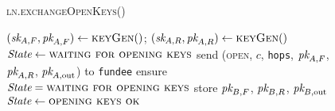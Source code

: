 \begin{figure}[H]
  \begin{processbox}{\textsc{ln.exchangeOpenKeys}()}
    \begin{algorithmic}[1]
      \State $(\textit{sk}_{A, F}, \textit{pk}_{A, F}) \gets \textsc{keyGen}()$;
      $(\textit{sk}_{A, R}, \textit{pk}_{A, R}) \gets \textsc{keyGen}()$
      \State $\itistate \gets \textsc{waiting for opening keys}$
      \State send (\textsc{open}, $c$, \texttt{hops}, $\textit{pk}_{A, F}$, $\textit{pk}_{A, R}$,
      $\textit{pk}_{A, \mathrm{out}}$) to \texttt{fundee}
      \label{code:ln:exchange-open-keys:bob-open}
      \State {}
      \State {}
      \State {}
      \State {}
      \State {}
       
        \State {}
        \State {} 
        \State {}
      \Else \: 
        \State {}
      \EndIf
      \State {}
      \label{code:ln:exchange-open-keys:accept-channel}
      \State ensure $\itistate = \textsc{waiting for opening keys}$
      \State store $\textit{pk}_{B, F}$, $\textit{pk}_{B, R}$, $\textit{pk}_{B, \mathrm{out}}$
      \State $\itistate \gets \textsc{opening keys ok}$
    \end{algorithmic}
  \end{processbox}
  \caption{}
  \label{code:ln:exchange-open-keys}
\end{figure}

